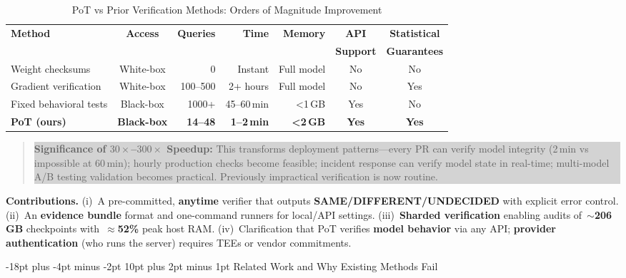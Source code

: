 \documentclass[11pt]{article}
\makeatletter
\renewcommand\section{\@startsection{section}{1}{\z@}%
  {-18pt plus -4pt minus -2pt}%
  {10pt plus 2pt minus 1pt}%
  {\normalfont\Large\bfseries}}
\makeatother
\begin{document}
\begin{table}[ht!]
\centering
\caption{PoT vs Prior Verification Methods: Orders of Magnitude Improvement}
\small
\begin{tabular}{l c r r r c c}
\toprule
\textbf{Method} & \textbf{Access} & \textbf{Queries} & \textbf{Time} & \textbf{Memory} & \textbf{API} & \textbf{Statistical} \\
& & & & & \textbf{Support} & \textbf{Guarantees} \\
\midrule
Weight checksums & White-box & 0 & Instant & Full model & No & No \\
Gradient verification~\cite{jia2021proof} & White-box & 100--500 & 2+ hours & Full model & No & Yes \\
Fixed behavioral tests & Black-box & 1000+ & 45--60\,min & <1\,GB & Yes & No \\
\textbf{PoT (ours)} & \textbf{Black-box} & \textbf{14--48} & \textbf{1--2\,min} & \textbf{<2\,GB} & \textbf{Yes} & \textbf{Yes} \\
\bottomrule
\end{tabular}
\end{table}

\begin{quote}
\colorbox{lightgray}{\parbox{0.95\textwidth}{\textbf{Significance of $30{\times}$--$300{\times}$ Speedup:} This transforms deployment patterns---every PR can verify model integrity (2\,min vs impossible at 60\,min); hourly production checks become feasible; incident response can verify model state in real-time; multi-model A/B testing validation becomes practical. Previously impractical verification is now routine.}}
\end{quote}

\textbf{Contributions.} (i)~A pre-committed, \textbf{anytime} verifier that outputs \textbf{SAME/DIFFERENT/UNDECIDED} with explicit error control. (ii)~An \textbf{evidence bundle} format and one-command runners for local/API settings. (iii)~\textbf{Sharded verification} enabling audits of~${\sim}$\textbf{206\,GB} checkpoints with~${\approx}$\textbf{52\%} peak host RAM\@. (iv)~Clarification that PoT verifies \textbf{model behavior} via any API; \textbf{provider authentication} (who runs the server) requires TEEs or vendor commitments.

\section{Related Work and Why Existing Methods Fail}
\end{document}
